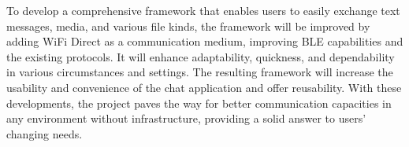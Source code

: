 \documentclass[12pt, conference, onecolumn, a4paper]{IEEEtran}
\begin{document}
To develop a comprehensive framework that enables users to easily exchange text
messages, media, and various file kinds, the framework will be improved by
adding WiFi Direct as a communication medium, improving BLE capabilities and
the existing protocols. It will enhance adaptability, quickness, and
dependability in various circumstances and settings. The resulting framework
will increase the usability and convenience of the chat application and offer
reusability. With these developments, the project paves the way for better
communication capacities in any environment without infrastructure, providing a
solid answer to users' changing needs.


% 
% 
\end{document}
